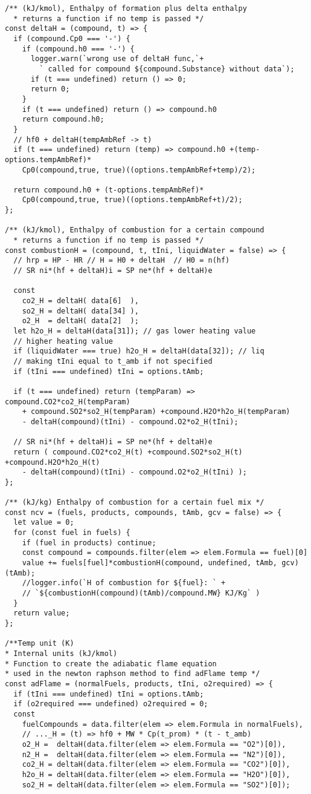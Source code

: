 \begin{verbatim}
/** (kJ/kmol), Enthalpy of formation plus delta enthalpy 
  * returns a function if no temp is passed */
const deltaH = (compound, t) => {
  if (compound.Cp0 === '-') {
    if (compound.h0 === '-') {
      logger.warn(`wrong use of deltaH func,`+
        ` called for compound ${compound.Substance} without data`);
      if (t === undefined) return () => 0;
      return 0;
    }
    if (t === undefined) return () => compound.h0
    return compound.h0;
  }
  // hf0 + deltaH(tempAmbRef -> t)
  if (t === undefined) return (temp) => compound.h0 +(temp-options.tempAmbRef)*
    Cp0(compound,true, true)((options.tempAmbRef+temp)/2);

  return compound.h0 + (t-options.tempAmbRef)*
    Cp0(compound,true, true)((options.tempAmbRef+t)/2);
};

/** (kJ/kmol), Enthalpy of combustion for a certain compound 
  * returns a function if no temp is passed */
const combustionH = (compound, t, tIni, liquidWater = false) => {
  // hrp = HP - HR // H = H0 + deltaH  // H0 = n(hf)
  // SR ni*(hf + deltaH)i = SP ne*(hf + deltaH)e

  const 
    co2_H = deltaH( data[6]  ),
    so2_H = deltaH( data[34] ),
    o2_H  = deltaH( data[2]  );
  let h2o_H = deltaH(data[31]); // gas lower heating value 
  // higher heating value
  if (liquidWater === true) h2o_H = deltaH(data[32]); // liq
  // making tIni equal to t_amb if not specified
  if (tIni === undefined) tIni = options.tAmb;

  if (t === undefined) return (tempParam) => compound.CO2*co2_H(tempParam) 
    + compound.SO2*so2_H(tempParam) +compound.H2O*h2o_H(tempParam)
    - deltaH(compound)(tIni) - compound.O2*o2_H(tIni);
  
  // SR ni*(hf + deltaH)i = SP ne*(hf + deltaH)e
  return ( compound.CO2*co2_H(t) +compound.SO2*so2_H(t) +compound.H2O*h2o_H(t)
    - deltaH(compound)(tIni) - compound.O2*o2_H(tIni) );
};

/** (kJ/kg) Enthalpy of combustion for a certain fuel mix */
const ncv = (fuels, products, compounds, tAmb, gcv = false) => {
  let value = 0;
  for (const fuel in fuels) {
    if (fuel in products) continue;
    const compound = compounds.filter(elem => elem.Formula == fuel)[0]
    value += fuels[fuel]*combustionH(compound, undefined, tAmb, gcv)(tAmb);
    //logger.info(`H of combustion for ${fuel}: ` +
    // `${combustionH(compound)(tAmb)/compound.MW} KJ/Kg` )
  }
  return value;
};

/**Temp unit (K)
* Internal units (kJ/kmol)
* Function to create the adiabatic flame equation 
* used in the newton raphson method to find adFlame temp */
const adFlame = (normalFuels, products, tIni, o2required) => {
  if (tIni === undefined) tIni = options.tAmb;
  if (o2required === undefined) o2required = 0;
  const 
    fuelCompounds = data.filter(elem => elem.Formula in normalFuels),
    // ..._H = (t) => hf0 + MW * Cp(t_prom) * (t - t_amb)
    o2_H =  deltaH(data.filter(elem => elem.Formula == "O2")[0]),
    n2_H =  deltaH(data.filter(elem => elem.Formula == "N2")[0]),
    co2_H = deltaH(data.filter(elem => elem.Formula == "CO2")[0]),
    h2o_H = deltaH(data.filter(elem => elem.Formula == "H2O")[0]),
    so2_H = deltaH(data.filter(elem => elem.Formula == "SO2")[0]);


\end{verbatim}
